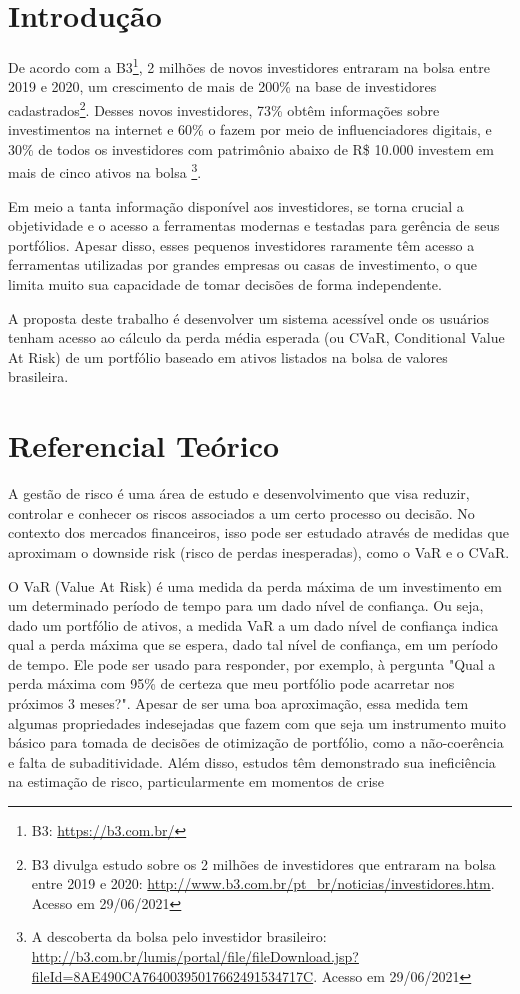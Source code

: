 \documentclass[12pt, oneside, a4paper,english,brazil]{abntex2}
\begin{document}
\imprimircapa
\imprimirfolhaderosto

\tableofcontents* %

\textual

\chapter{Introdução}
De acordo com a B3\footnote{B3: \url{https://b3.com.br/}}, 2 milhões de novos investidores entraram na bolsa entre 2019 e 2020, um crescimento de mais de 200\% na base de investidores cadastrados\footnote{B3 divulga estudo sobre os 2 milhões de investidores que entraram na bolsa entre 2019 e 2020: \url{http://www.b3.com.br/pt_br/noticias/investidores.htm}. Acesso em 29/06/2021}. Desses novos investidores, 73\% obtêm informações sobre investimentos na internet e 60\% o fazem por meio de influenciadores digitais, e 30\% de todos os investidores com patrimônio abaixo de R\$ 10.000 investem em mais de cinco ativos na bolsa \footnote{A descoberta da bolsa pelo investidor brasileiro: \url{http://b3.com.br/lumis/portal/file/fileDownload.jsp?fileId=8AE490CA76400395017662491534717C}. Acesso em 29/06/2021}.

Em meio a tanta informação disponível aos investidores, se torna crucial a objetividade e o acesso a ferramentas modernas e testadas para gerência de seus portfólios. Apesar disso, esses pequenos investidores raramente têm acesso a ferramentas utilizadas por grandes empresas ou casas de investimento, o que limita muito sua capacidade de tomar decisões de forma independente.

A proposta deste trabalho é desenvolver um sistema acessível onde os usuários tenham acesso ao cálculo da perda média esperada (ou CVaR, Conditional Value At Risk) de um portfólio baseado em ativos listados na bolsa de valores brasileira.

\chapter{Referencial Teórico}
A gestão de risco é uma área de estudo e desenvolvimento que visa reduzir, controlar e conhecer os riscos associados a um certo processo ou decisão. No contexto dos mercados financeiros, isso pode ser estudado através de medidas que aproximam o downside risk (risco de perdas inesperadas), como o VaR e o CVaR. 

O VaR (Value At Risk) é uma medida da perda máxima de um investimento em um determinado período de tempo para um dado nível de confiança. Ou seja, dado um portfólio de ativos, a medida VaR a um dado nível de confiança indica qual a perda máxima que se espera, dado tal nível de confiança, em um período de tempo. Ele pode ser usado para responder, por exemplo, à pergunta "Qual a perda máxima com 95\% de certeza que meu portfólio pode acarretar nos próximos 3 meses?". Apesar de ser uma boa aproximação, essa medida tem algumas propriedades indesejadas que fazem com que seja um instrumento muito básico para tomada de decisões de otimização de portfólio, como a não-coerência e falta de subaditividade. Além disso, estudos têm demonstrado sua ineficiência na estimação de risco, particularmente em momentos de crise \cite{Mutu2011}
\end{document}

